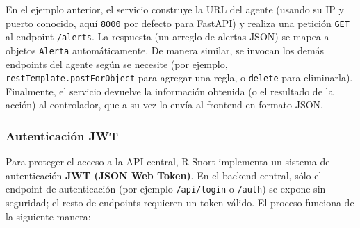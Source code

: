 \documentclass[11pt,a4paper,twoside]{report}
\begin{document}
En el ejemplo anterior, el servicio construye la URL del agente (usando su IP y puerto conocido, aquí \texttt{8000} por defecto para FastAPI) y realiza una petición \texttt{GET} al endpoint \texttt{/alerts}. La respuesta (un arreglo de alertas JSON) se mapea a objetos \texttt{Alerta} automáticamente. De manera similar, se invocan los demás endpoints del agente según se necesite (por ejemplo, \texttt{restTemplate.postForObject} para agregar una regla, o \texttt{delete} para eliminarla). Finalmente, el servicio devuelve la información obtenida (o el resultado de la acción) al controlador, que a su vez lo envía al frontend en formato JSON.

\subsubsection*{Autenticación JWT}

Para proteger el acceso a la API central, R-Snort implementa un sistema de autenticación \textbf{JWT (JSON Web Token)}. En el backend central, sólo el endpoint de autenticación (por ejemplo \texttt{/api/login} o \texttt{/auth}) se expone sin seguridad; el resto de endpoints requieren un token válido. El proceso funciona de la siguiente manera:
\end{document}
